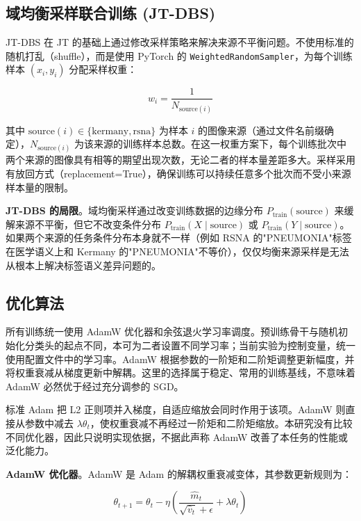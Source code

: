 \documentclass[12pt,a4paper,UTF8,openany]{ctexbook}
\begin{document}
\subsection{域均衡采样联合训练 (JT-DBS)}

JT-DBS 在 JT 的基础上通过修改采样策略来解决来源不平衡问题。不使用标准的随机打乱（shuffle），而是使用 PyTorch 的 \texttt{WeightedRandomSampler}，为每个训练样本 $(x_i, y_i)$ 分配采样权重：

\begin{equation}
w_i = \frac{1}{N_{\text{source}(i)}}
\end{equation}

其中 $\text{source}(i) \in \{\text{kermany}, \text{rsna}\}$ 为样本 $i$ 的图像来源（通过文件名前缀确定），$N_{\text{source}(i)}$ 为该来源的训练样本总数。在这一权重方案下，每个训练批次中两个来源的图像具有相等的期望出现次数，无论二者的样本量差距多大。采样采用有放回方式（replacement=True），确保训练可以持续任意多个批次而不受小来源样本量的限制。

\textbf{JT-DBS 的局限}。域均衡采样通过改变训练数据的边缘分布 $P_{\text{train}}(\text{source})$ 来缓解来源不平衡，但它不改变条件分布 $P_{\text{train}}(X \mid \text{source})$ 或 $P_{\text{train}}(Y \mid \text{source})$。如果两个来源的任务条件分布本身就不一样（例如 RSNA 的"PNEUMONIA"标签在医学语义上和 Kermany 的"PNEUMONIA"不等价），仅仅均衡来源采样是无法从根本上解决标签语义差异问题的。

\subsection{优化算法}

所有训练统一使用 AdamW 优化器和余弦退火学习率调度。预训练骨干与随机初始化分类头的起点不同，本可为二者设置不同学习率；当前实验为控制变量，统一使用配置文件中的学习率。AdamW 根据参数的一阶矩和二阶矩调整更新幅度，并将权重衰减从梯度更新中解耦。这里的选择属于稳定、常用的训练基线，不意味着 AdamW 必然优于经过充分调参的 SGD。

标准 Adam 把 L2 正则项并入梯度，自适应缩放会同时作用于该项。AdamW 则直接从参数中减去 $\lambda\theta_t$，使权重衰减不再经过一阶矩和二阶矩缩放。本研究没有比较不同优化器，因此只说明实现依据，不据此声称 AdamW 改善了本任务的性能或泛化能力。

\textbf{AdamW 优化器}。AdamW 是 Adam 的解耦权重衰减变体，其参数更新规则为：

\begin{equation}
\theta_{t+1} = \theta_t - \eta\left(\frac{\hat{m}_t}{\sqrt{\hat{v}_t} + \epsilon} + \lambda\theta_t\right)
\end{equation}
\end{document}
